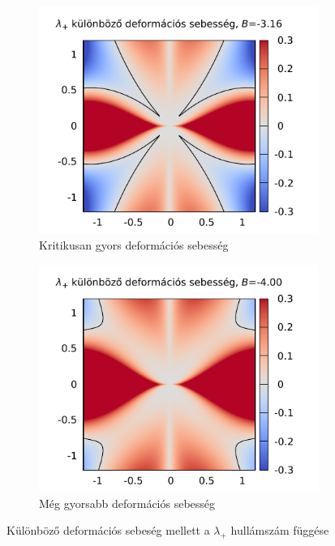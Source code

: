 \documentclass[10pt,a4paper]{scrartcl}
\begin{document}
\begin{figure}[htb]
\begin{subfigure}[t]{0.495\linewidth}
\centering\includegraphics[scale=0.95]{"figs/lambda_k_surface_B=-3_16"}
\caption{Kritikusan gyors deformációs sebesség}
\end{subfigure}
\begin{subfigure}[t]{0.495\linewidth}
\centering\includegraphics[scale=0.95]{"figs/lambda_k_surface_B=-4"}
\caption{Még gyorsabb deformációs sebesség}
\end{subfigure}
\caption{Különböző deformációs sebeség mellett a $\lambda_+$ hullámszám függése}
\end{figure}
\FloatBarrier
\end{document}
